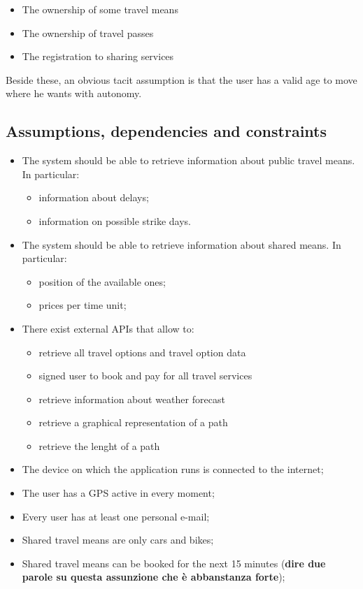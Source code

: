 \begin{itemize}
\item The ownership of some travel means
\item The ownership of travel passes
\item The registration to sharing services
\end{itemize}

Beside these, an obvious tacit assumption is that the user has a valid age to move where he wants with autonomy.


\subsection{ Assumptions, dependencies and constraints}

\begin{itemize}

\item The system should be able to retrieve information about public travel means. In particular:
\begin{itemize}
\item information about delays;
\item information on possible strike days.
\end{itemize}

\item The system should be able to retrieve information about shared means. In particular:
\begin{itemize}
\item position of the available ones;
\item prices per time unit;
\end{itemize}

\item There exist external APIs that allow to:
\begin{itemize}
\item retrieve all travel options and travel option data
\item signed user to book and pay for all travel services
\item retrieve information about weather forecast
\item retrieve a graphical representation of a path
\item retrieve the lenght of a path
\end{itemize}

\item The device on which the application runs is connected to the internet;

\item The user has a GPS active in every moment;

\item Every user has at least one personal e-mail;

\item Shared travel means are only cars and bikes;

\item Shared travel means can be booked for the next 15 minutes (\textbf{dire due parole su questa assunzione che è abbanstanza forte});

\end{itemize}




